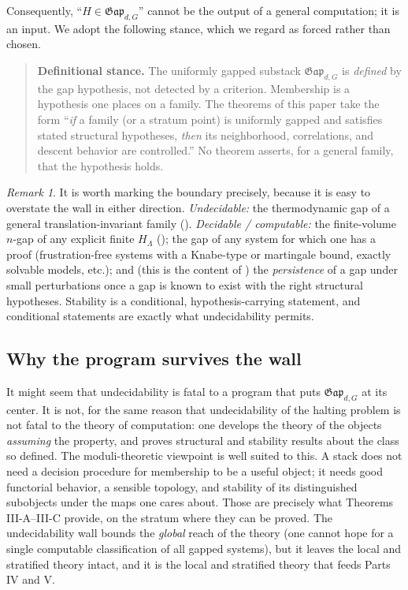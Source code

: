 \documentclass[12pt]{article}
\newcommand{\Gap}{\mathfrak{Gap}}              %
\theoremstyle{plain}
\theoremstyle{definition}
\theoremstyle{remark}
\newtheorem{remark}[remark]{Remark}
\begin{document}
Consequently, ``$H\in\Gap_{d,G}$'' cannot be the output of a general computation; it
is an input. We adopt the following stance, which we regard as forced rather than
chosen.

\begin{quote}
\textbf{Definitional stance.} The uniformly gapped substack $\Gap_{d,G}$ is
\emph{defined} by the gap hypothesis, not detected by a criterion. Membership is a
hypothesis one places on a family. The theorems of this paper take the form
``\emph{if} a family (or a stratum point) is uniformly gapped and satisfies stated
structural hypotheses, \emph{then} its neighborhood, correlations, and descent behavior
are controlled.'' No theorem asserts, for a general family, that the hypothesis holds.
\end{quote}

\begin{remark}
\label{rem:what-is-decidable}
It is worth marking the boundary precisely, because it is easy to overstate the wall
in either direction. \emph{Undecidable:} the thermodynamic gap of a general
translation-invariant family (). \emph{Decidable / computable:} the
finite-volume $n$-gap of any explicit finite $H_\Lambda$ (); the
gap of any system for which one has a proof (frustration-free systems with a
Knabe-type or martingale bound, exactly solvable models, etc.); and (this is the
content of ) the \emph{persistence} of a gap under small
perturbations once a gap is known to exist with the right structural hypotheses.
Stability is a conditional, hypothesis-carrying statement, and conditional statements
are exactly what undecidability permits.
\end{remark}

\subsection{Why the program survives the wall}
\label{sec:wall-survives}

It might seem that undecidability is fatal to a program that puts $\Gap_{d,G}$ at its
center. It is not, for the same reason that undecidability of the halting problem is
not fatal to the theory of computation: one develops the theory of the objects
\emph{assuming} the property, and proves structural and stability results about the
class so defined. The moduli-theoretic viewpoint is well suited to this. A stack does
not need a decision procedure for membership to be a useful object; it needs good
functorial behavior, a sensible topology, and stability of its distinguished
subobjects under the maps one cares about. Those are precisely what Theorems
III-A--III-C provide, on the stratum where they can be proved. The undecidability
wall bounds the \emph{global} reach of the theory (one cannot hope for a single
computable classification of all gapped systems), but it leaves the local and
stratified theory intact, and it is the local and stratified theory that feeds Parts
IV and V\@.
\end{document}
